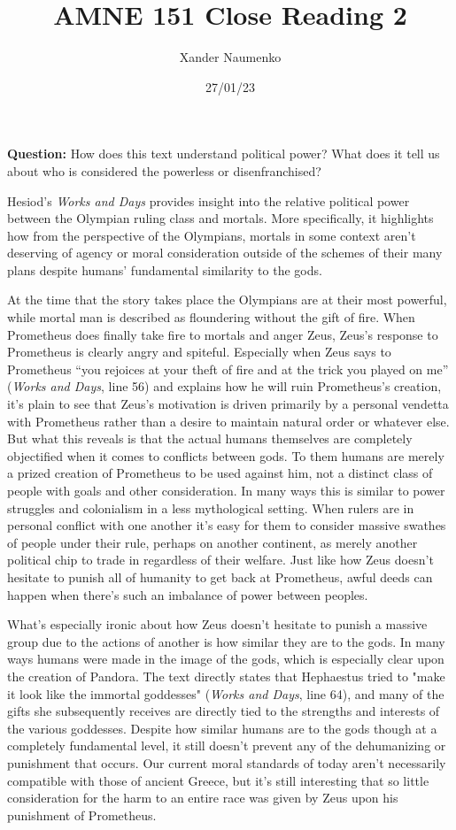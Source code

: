 \documentclass[letterpaper, reqno,11pt]{article}
\begin{document}
\title{AMNE 151 Close Reading 2}
\date{27/01/23}
\author{Xander Naumenko}
\maketitle

{\bf Question:} How does this text understand political power? What does it tell us about who is considered the powerless or disenfranchised?  

\medskip

Hesiod's \emph{Works and Days} provides insight into the relative political power between the Olympian ruling class and mortals. More specifically, it highlights how from the perspective of the Olympians, mortals in some context aren't deserving of agency or moral consideration outside of the schemes of their many plans despite humans' fundamental similarity to the gods. 

At the time that the story takes place the Olympians are at their most powerful, while mortal man is described as floundering without the gift of fire. When Prometheus does finally take fire to mortals and anger Zeus, Zeus's response to Prometheus is clearly angry and spiteful. Especially when Zeus says to Prometheus ``you rejoices at your theft of fire and at the trick you played on me'' (\emph{Works and Days}, line 56) and explains how he will ruin Prometheus's creation, it's plain to see that Zeus's motivation is driven primarily by a personal vendetta with Prometheus rather than a desire to maintain natural order or whatever else. But what this reveals is that the actual humans themselves are completely objectified when it comes to conflicts between gods. To them humans are merely a prized creation of Prometheus to be used against him, not a distinct class of people with goals and other consideration. In many ways this is similar to power struggles and colonialism in a less mythological setting. When rulers are in personal conflict with one another it's easy for them to consider massive swathes of people under their rule, perhaps on another continent, as merely another political chip to trade in regardless of their welfare. Just like how Zeus doesn't hesitate to punish all of humanity to get back at Prometheus, awful deeds can happen when there's such an imbalance of power between peoples.  

What's especially ironic about how Zeus doesn't hesitate to punish a massive group due to the actions of another is how similar they are to the gods. In many ways humans were made in the image of the gods, which is especially clear upon the creation of Pandora. The text directly states that Hephaestus tried to "make it look like the immortal goddesses" (\emph{Works and Days}, line 64), and many of the gifts she subsequently receives are directly tied to the strengths and interests of the various goddesses. Despite how similar humans are to the gods though at a completely fundamental level, it still doesn't prevent any of the dehumanizing or punishment that occurs. Our current moral standards of today aren't necessarily compatible with those of ancient Greece, but it's still interesting that so little consideration for the harm to an entire race was given by Zeus upon his punishment of Prometheus. 
\end{document}

